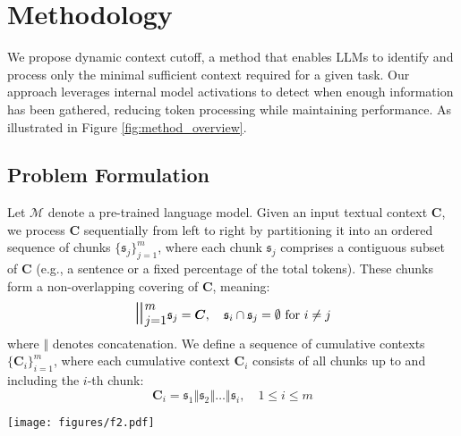 \section{Methodology}  
\label{sec:method}

\noindent\begin{minipage}[t]{0.48\textwidth}
We propose dynamic context cutoff, a method that enables LLMs to identify and process only the minimal sufficient context required for a given task. Our approach leverages internal model activations to detect when enough information has been gathered, reducing token processing while maintaining performance. As illustrated in Figure \ref{fig:method_overview}.

\subsection{Problem Formulation}
Let \(\mathcal{M}\) denote a pre-trained language model. Given an input textual context \(\mathbf{C}\), we process \(\mathbf{C}\) sequentially from left to right by partitioning it into an ordered sequence of chunks \(\{\mathfrak{s}_j\}_{j=1}^m\), where each chunk \(\mathfrak{s}_j\) comprises a contiguous subset of \(\mathbf{C}\) (e.g., a sentence or a fixed percentage of the total tokens). These chunks form a non-overlapping covering of \(\mathbf{C}\), meaning:
\[
\mathlarger{\mathlarger{\mathlarger{\mathbin\Vert}}}_{j=1}^{m} \mathfrak{s}_j = \mathbf{C}, \quad \mathfrak{s}_i \cap \mathfrak{s}_j = \emptyset \text{ for } i \neq j
\]
where \(\mathbin\Vert\) denotes concatenation. We define a sequence of cumulative contexts \(\{\mathbf{C}_i\}_{i=1}^m\), where each cumulative context \(\mathbf{C}_i\) consists of all chunks up to and including the \(i\)-th chunk: 
\[
\mathbf{C}_i = \mathfrak{s}_1 \mathbin\Vert \mathfrak{s}_2 \mathbin\Vert \dots \mathbin\Vert \mathfrak{s}_i, \quad 1 \leq i \leq m
\]
\end{minipage}
\hfill
\begin{minipage}[t]{0.48\textwidth}
\centering
\vspace{-5mm}
\texttt{[image: figures/f2.pdf]}
\vspace{-6mm}
\label{fig:method_overview}
\end{minipage}

